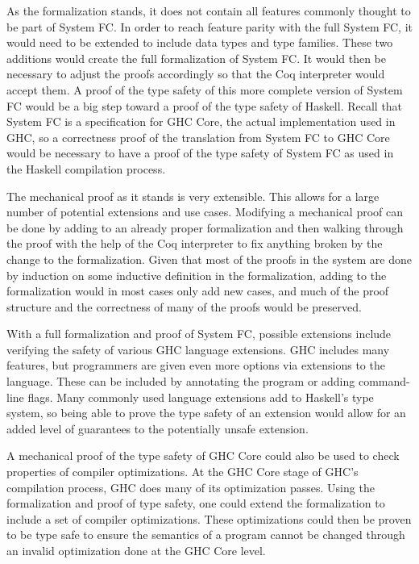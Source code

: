\documentclass{sig-alternate}
\begin{document}
As the formalization stands, it does not contain all features commonly thought to be part of System FC. In order to reach feature parity with the full System FC, it would need to be extended to include data types and type families. These two additions would create the full formalization of System FC. It would then be necessary to adjust the proofs accordingly so that the Coq interpreter would accept them. A proof of the type safety of this more complete version of System FC would be a big step toward a proof of the type safety of Haskell. Recall that System FC is a specification for GHC Core, the actual implementation used in GHC, so a correctness proof of the translation from System FC to GHC Core would be necessary to have a proof of the type safety of System FC as used in the Haskell compilation process.

The mechanical proof as it stands is very extensible. This allows for a large number of potential extensions and use cases. Modifying a mechanical proof can be done by adding to an already proper formalization and then walking through the proof with the help of the Coq interpreter to fix anything broken by the change to the formalization. Given that most of the proofs in the system are done by induction on some inductive definition in the formalization, adding to the formalization would in most cases only add new cases, and much of the proof structure and the correctness of many of the proofs would be preserved.

With a full formalization and proof of System FC, possible extensions include verifying the safety of various GHC language extensions. GHC includes many features, but programmers are given even more options via extensions to the language. These can be included by annotating the program or adding command-line flags. Many commonly used language extensions add to Haskell's type system, so being able to prove the type safety of an extension would allow for an added level of guarantees to the potentially unsafe extension.

A mechanical proof of the type safety of GHC Core could also be used to check properties of compiler optimizations. At the GHC Core stage of GHC's compilation process, GHC does many of its optimization passes. Using the formalization and proof of type safety, one could extend the formalization to include a set of compiler optimizations. These optimizations could then be proven to be type safe to ensure the semantics of a program cannot be changed through an invalid optimization done at the GHC Core level.
\end{document}
